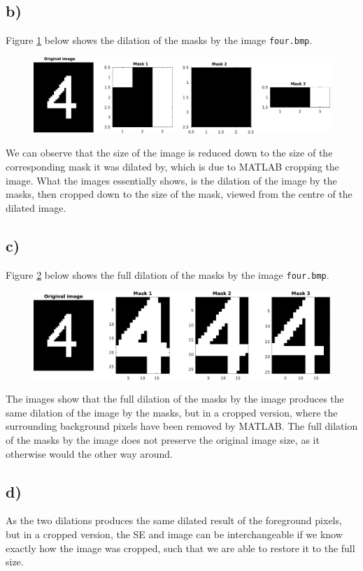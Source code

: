 \documentclass[a4paper]{article}
\begin{document}
\subsection*{b)}
Figure \ref{fig:q1b} below shows the dilation of the masks by the image \texttt{four.bmp}.
\begin{figure}[H]
\begin{center}
  \includegraphics[scale=0.5]{q1b.pdf}
\end{center}
\caption{}
\label{fig:q1b}
\end{figure}
We can observe that the size of the image is reduced down to the size of the corresponding mask it was dilated by, which is due to MATLAB cropping the image. What the images essentially shows, is the dilation of the image by the masks, then cropped down to the size of the mask, viewed from the centre of the dilated image.
\subsection*{c)}
Figure \ref{fig:q1c} below shows the full dilation of the masks by the image \texttt{four.bmp}.
\begin{figure}[H]
\begin{center}
  \includegraphics[scale=0.5]{q1c.pdf}
\end{center}
\caption{}
\label{fig:q1c}
\end{figure}
The images show that the full dilation of the masks by the image produces the same dilation of the image by the masks, but in a cropped version, where the surrounding background pixels have been removed by MATLAB. The full dilation of the masks by the image does not preserve the original image size, as it otherwise would the other way around.
\subsection*{d)}
As the two dilations produces the same dilated result of the foreground pixels, but in a cropped version, the SE and image can be interchangeable if we know exactly how the image was cropped, such that we are able to restore it to the full size.
\end{document}
